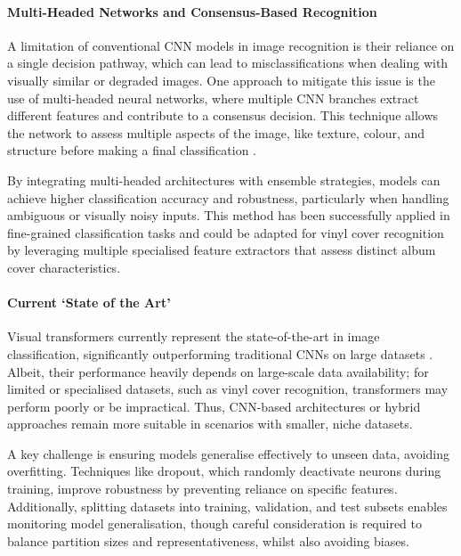             \paragraph{Multi-Headed Networks and Consensus-Based Recognition}
    
                A limitation of conventional CNN models in image recognition is their reliance on a single decision pathway, which can lead to misclassifications when dealing with visually similar or degraded images. One approach to mitigate this issue is the use of multi-headed neural networks, where multiple CNN branches extract different features and contribute to a consensus decision. This technique allows the network to assess multiple aspects of the image, like texture, colour, and structure before making a final classification \cite{Zheng2017}. 
            
                By integrating multi-headed architectures with ensemble strategies, models can achieve higher classification accuracy and robustness, particularly when handling ambiguous or visually noisy inputs. This method has been successfully applied in fine-grained classification tasks and could be adapted for vinyl cover recognition by leveraging multiple specialised feature extractors that assess distinct album cover characteristics.
    
            \paragraph{Current `State of the Art'}
    
                Visual transformers currently represent the state-of-the-art in image classification, significantly outperforming traditional CNNs on large datasets \cite{dosovitskiy2020vit}. Albeit, their performance heavily depends on large-scale data availability; for limited or specialised datasets, such as vinyl cover recognition, transformers may perform poorly or be impractical. Thus, CNN-based architectures or hybrid approaches remain more suitable in scenarios with smaller, niche datasets.
    
                A key challenge is ensuring models generalise effectively to unseen data, avoiding overfitting. Techniques like dropout, which randomly deactivate neurons during training, improve robustness by preventing reliance on specific features. Additionally, splitting datasets into training, validation, and test subsets enables monitoring model generalisation, though careful consideration is required to balance partition sizes and representativeness, whilst also avoiding biases.
    
